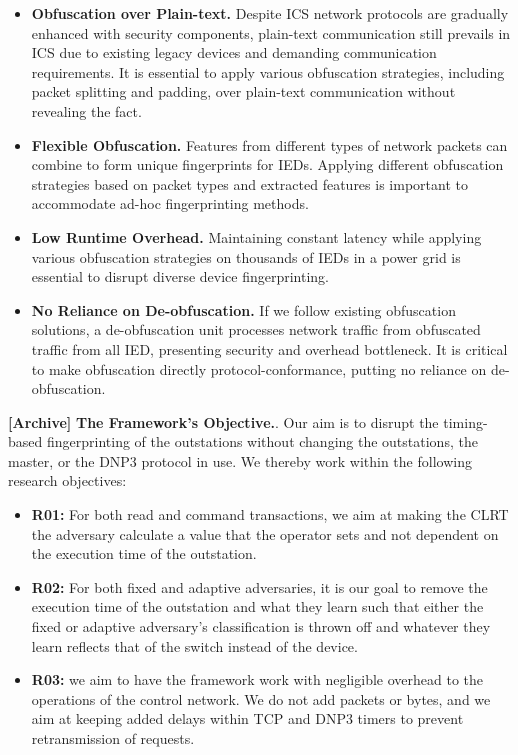 \documentclass[conference]{IEEEtran}
\begin{document}
\begin{itemize}[leftmargin=*,labelindent=0pt,labelsep=12pt, listparindent= 12pt,topsep=0pt, itemsep=0pt, parsep=0pt]

\item \textbf{Obfuscation over Plain-text.} Despite ICS network protocols are gradually enhanced with security components, plain-text communication still prevails in ICS due to existing legacy devices and demanding communication requirements. It is essential to apply various obfuscation strategies, including packet splitting and padding, over plain-text communication without revealing the fact. 

\item \textbf{Flexible Obfuscation.} Features from different types of network packets can combine to form unique fingerprints for IEDs. Applying different obfuscation strategies based on packet types and extracted features is important to accommodate ad-hoc fingerprinting methods.

\item \textbf{Low Runtime Overhead.} Maintaining constant latency while applying various obfuscation strategies on thousands of IEDs in a power grid is essential to disrupt diverse device fingerprinting. 

\item \textbf{No Reliance on De-obfuscation.} If we follow existing obfuscation solutions, a de-obfuscation unit processes network traffic from obfuscated traffic from all IED, presenting security and overhead bottleneck. It is critical to make obfuscation directly protocol-conformance, putting no reliance on de-obfuscation.  

\end{itemize}

\textbf{[Archive]}\textbf{ The Framework's Objective.}. Our aim is to disrupt the timing-based fingerprinting of the outstations without changing the outstations, the master, or the DNP3 protocol in use. We thereby work within the following research objectives:
\begin{itemize}
    \item \textbf{R01:} For both read and command transactions, we aim at making the CLRT the adversary calculate a value that the operator sets and not dependent on the execution time of the outstation.
    \item \textbf{R02:} For both fixed and adaptive adversaries, it is our goal to remove the execution time of the outstation and what they learn  such that either the fixed or adaptive adversary's classification is thrown off and whatever they learn reflects that of the switch instead of the device.
    \item \textbf{R03:} we aim to have the framework work with negligible overhead to the operations of the control network. We do not add packets or bytes, and we aim at keeping added delays within TCP and DNP3 timers to prevent retransmission of requests.
\end{itemize}
\end{document}
